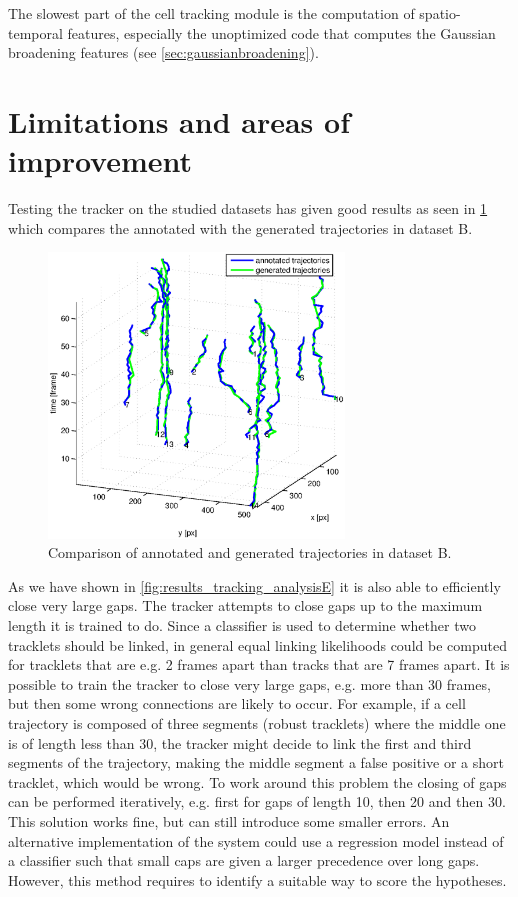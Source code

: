 	The slowest part of the cell tracking module is the computation of spatio-temporal features, especially the unoptimized code that computes the Gaussian broadening features (see \cref{sec:gaussianbroadening}).
	
\section{Limitations and areas of improvement}
	\label{sec:results_limitations}
	
	Testing the tracker on the studied datasets has given good results as seen in \cref{fig:tracking_results_datasetBlongerthan10} which compares the annotated with the generated trajectories in dataset B.
	
	\begin{figure}[h]
		\centering
		\includegraphics[width=0.7\textwidth]{images/fig_results_tracking_analysis_2}
		\caption{Comparison of annotated and generated trajectories in dataset B.}
		\label{fig:tracking_results_datasetBlongerthan10}
	\end{figure}
	
	As we have shown in \cref{fig:results_tracking_analysisE} it is also able to efficiently close very large gaps. The tracker attempts to close gaps up to the maximum length it is trained to do. Since a classifier is used to determine whether two tracklets should be linked, in general equal linking likelihoods could be computed for tracklets that are e.g. 2 frames apart than tracks that are 7 frames apart. It is possible to train the tracker to close very large gaps, e.g. more than 30 frames, but then some wrong connections are likely to occur. For example, if a cell trajectory is composed of three segments (robust tracklets) where the middle one is of length less than 30, the tracker might decide to link the first and third segments of the trajectory, making the middle segment a false positive or a short tracklet, which would be wrong. To work around this problem the closing of gaps can be performed iteratively, e.g. first for gaps of length 10, then 20 and then 30. This solution works fine, but can still introduce some smaller errors. An alternative implementation of the system could use a regression model instead of a classifier such that small caps are given a larger precedence over long gaps. However, this method requires to identify a suitable way to score the hypotheses.
	
